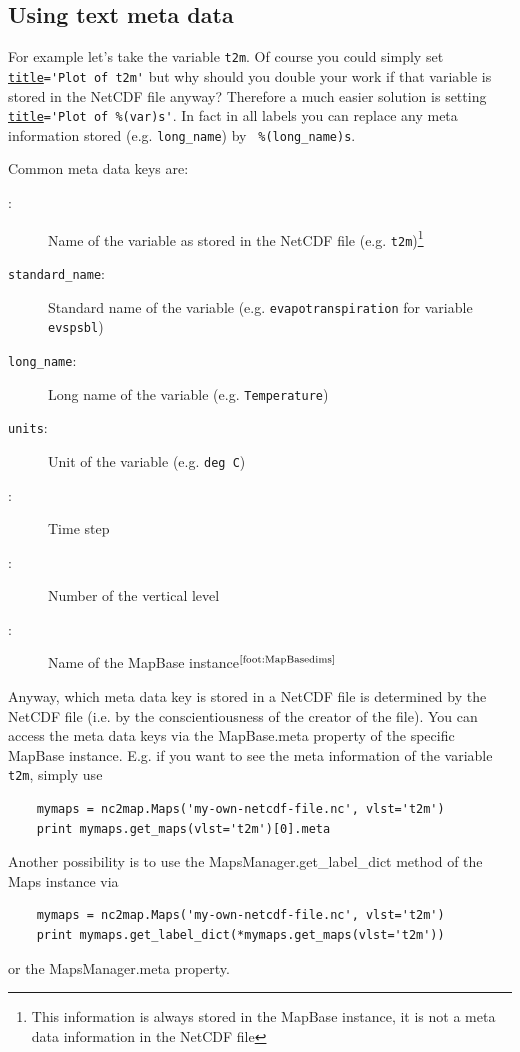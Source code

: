 \subsection{Using text meta data} \label{sec:labels_text}
For example let's take the variable \lstinline|t2m|. Of course you could simply set \hyperref[item:title]{\lstinline|title|}\lstinline|='Plot of t2m'| but why should you double your work if that variable is stored in the NetCDF file anyway? Therefore a much easier solution is setting \hyperref[item:title]{\lstinline|title|}\lstinline|='Plot of %(var)s'|. In fact in all labels you can replace any meta information stored (e.g. \lstinline|long_name|) by \lstinline| %(long_name)s|.

Common meta data keys are:
\begin{description}
	\item[:] Name of the variable as stored in the NetCDF file (e.g. \lstinline|t2m|)\footnote{\label{foot:MapBasedims}This information is always stored in the \gls{MapBase} instance, it is not a meta data information in the NetCDF file}
	\item[\texttt{standard\_name}:] Standard name of the variable (e.g. \lstinline|evapotranspiration| for variable \lstinline|evspsbl|)
	\item[\texttt{long\_name}:] Long name of the variable (e.g. \lstinline|Temperature|)
	\item[\texttt{units}:] Unit of the variable (e.g. \lstinline|deg C|)
	\item[:] Time step
	\item[:] Number of the vertical level
	\item[:] Name of the \gls{MapBase} instance$^\text{\ref{foot:MapBasedims}}$
\end{description}
Anyway, which meta data key is stored in a NetCDF file is determined by the NetCDF file (i.e. by the conscientiousness of the creator of the file). You can access the meta data keys via the \gls{MapBase.meta} property of the specific \gls{MapBase} instance. E.g. if you want to see the meta information of the variable \lstinline|t2m|, simply use
\begin{lstlisting}
	mymaps = nc2map.Maps('my-own-netcdf-file.nc', vlst='t2m')
	print mymaps.get_maps(vlst='t2m')[0].meta
\end{lstlisting}
Another possibility is to use the \gls{MapsManager.get_label_dict} method of the \gls{Maps} instance via
\begin{lstlisting}
	mymaps = nc2map.Maps('my-own-netcdf-file.nc', vlst='t2m')
	print mymaps.get_label_dict(*mymaps.get_maps(vlst='t2m'))
\end{lstlisting}
or the \gls{MapsManager.meta} property.

